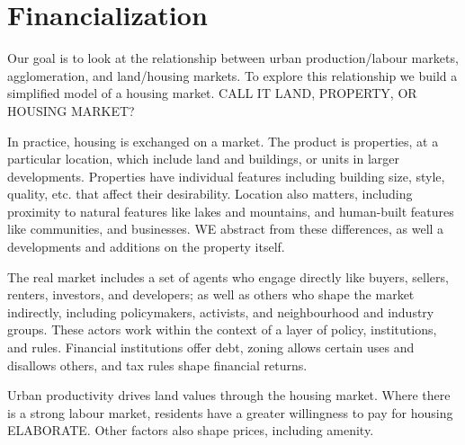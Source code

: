 

\section{Financialization}
Our goal is to look at the relationship between urban production/labour markets, agglomeration, and land/housing markets. To explore this relationship we build a simplified model of a \gls{housing market}. CALL IT LAND, PROPERTY, OR HOUSING MARKET? %

In practice, housing is exchanged on a market. The product is properties, at a particular location, which include land and buildings, or units in larger developments. Properties have individual features including building size, style, quality, etc. that affect their desirability. %
Location also matters, %
including proximity to natural features like lakes and mountains, and human-built features like communities, and businesses. WE abstract from these differences, as well a developments and additions on the property itself. 

The real market includes a set of agents who engage directly like buyers, sellers, renters, investors, and developers; as well as others who shape the market indirectly, including policymakers, activists, and neighbourhood and industry groups. %
These actors work within the context of a layer of policy, institutions, and rules. Financial institutions offer debt,
zoning allows certain uses and disallows others, and tax rules shape financial returns.

Urban productivity %
drives land values through the housing market. Where there is a strong labour market, residents have a greater willingness to pay for housing \cite{productivity_price_link} ELABORATE. 
Other factors also shape prices, including \gls{amenity}.

